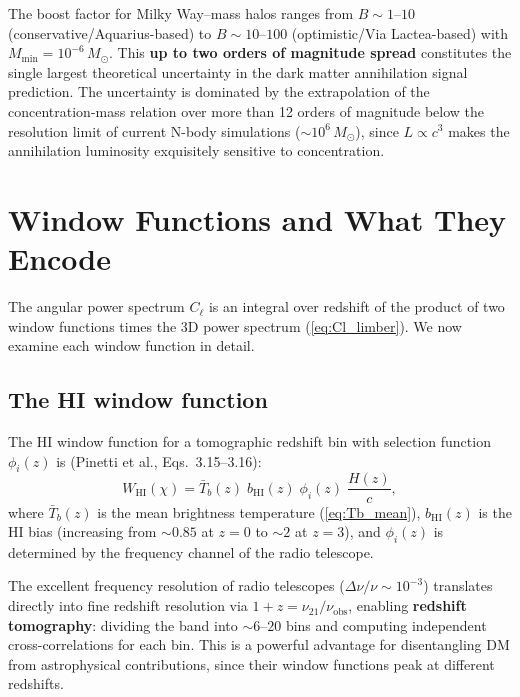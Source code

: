 \documentclass[10pt,a4paper]{article}
\newcommand{\Cl}{C_\ell}
\newcommand{\Msun}{M_\odot}
\begin{document}
The boost factor for Milky Way--mass halos ranges from $B \sim 1$--$10$ (conservative/Aquarius-based) to $B \sim 10$--$100$ (optimistic/Via Lactea-based) with $M_{\mathrm{min}} = 10^{-6} \, \Msun$. This \textbf{up to two orders of magnitude spread} constitutes the single largest theoretical uncertainty in the dark matter annihilation signal prediction. The uncertainty is dominated by the extrapolation of the concentration-mass relation over more than 12 orders of magnitude below the resolution limit of current N-body simulations ($\sim 10^6 \, \Msun$), since $L \propto c^3$ makes the annihilation luminosity exquisitely sensitive to concentration.


\section{Window Functions and What They Encode}
\label{sec:part5}

The angular power spectrum $\Cl$ is an integral over redshift of the product of two window functions times the 3D power spectrum (\cref{eq:Cl_limber}). We now examine each window function in detail.

\subsection{The HI window function}

The HI window function for a tomographic redshift bin with selection function $\phi_i(z)$ is (Pinetti et al., Eqs.~3.15--3.16):
\begin{equation}
\label{eq:W_HI}
W_{\mathrm{HI}}(\chi) = \bar{T}_b(z) \; b_{\mathrm{HI}}(z) \; \phi_i(z) \; \frac{H(z)}{c},
\end{equation}
where $\bar{T}_b(z)$ is the mean brightness temperature (\cref{eq:Tb_mean}), $b_{\mathrm{HI}}(z)$ is the HI bias (increasing from $\sim 0.85$ at $z = 0$ to $\sim 2$ at $z = 3$), and $\phi_i(z)$ is determined by the frequency channel of the radio telescope.

The excellent frequency resolution of radio telescopes ($\Delta\nu/\nu \sim 10^{-3}$) translates directly into fine redshift resolution via $1 + z = \nu_{21}/\nu_{\mathrm{obs}}$, enabling \textbf{redshift tomography}: dividing the band into $\sim 6$--$20$ bins and computing independent cross-correlations for each bin. This is a powerful advantage for disentangling DM from astrophysical contributions, since their window functions peak at different redshifts.
\end{document}
